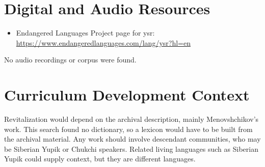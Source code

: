 \documentclass[12pt]{article}
\begin{document}
\section{Digital and Audio Resources}
\begin{itemize}
\item Endangered Languages Project page for ysr: \url{https://www.endangeredlanguages.com/lang/ysr?hl=en}
\end{itemize}
No audio recordings or corpus were found.

\section{Curriculum Development Context}
Revitalization would depend on the archival description, mainly Menovshchikov's work. This search found no dictionary, so a lexicon would have to be built from the archival material. Any work should involve descendant communities, who may be Siberian Yupik or Chukchi speakers. Related living languages such as Siberian Yupik could supply context, but they are different languages.
\end{document}

